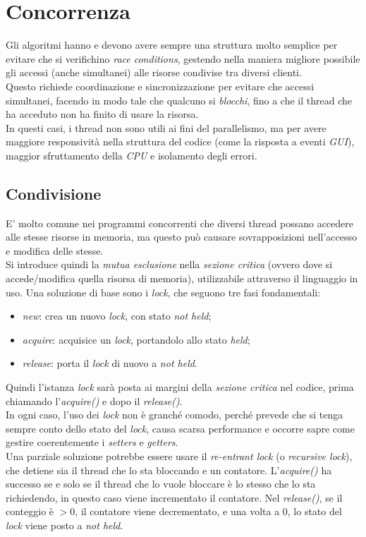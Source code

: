 \section{Concorrenza}
Gli algoritmi hanno e devono avere sempre una struttura molto semplice per evitare che si verifichino \textit{race conditions}, gestendo nella maniera migliore possibile gli accessi (anche simultanei) alle risorse condivise tra diversi clienti. \\
Questo richiede coordinazione e sincronizzazione per evitare che accessi simultanei, facendo in modo tale che qualcuno si \textit{blocchi}, fino a che il thread che ha acceduto non ha finito di usare la risorsa. \\
In questi casi, i thread non sono utili ai fini del parallelismo, ma per avere maggiore responsività nella struttura del codice (come la risposta a eventi \textit{GUI}), maggior sfruttamento della \textit{CPU} e isolamento degli errori. \\

\subsection{Condivisione}
E' molto comune nei programmi concorrenti che diversi thread possano accedere alle stesse risorse in memoria, ma questo può causare sovrapposizioni nell'accesso e modifica delle stesse. \\
Si introduce quindi la \textit{mutua esclusione} nella \textit{sezione critica} (ovvero dove si accede/modifica quella risorsa di memoria), utilizzabile attraverso il linguaggio in uso.
Una soluzione di base sono i \textit{lock}, che seguono tre fasi fondamentali:
\begin{itemize}
	\item \textit{new}: crea un nuovo \textit{lock}, con stato \textit{not held};
	\item \textit{acquire}: acquisice un \textit{lock}, portandolo allo stato \textit{held};
	\item \textit{release}: porta il \textit{lock} di nuovo a \textit{not held}.
\end{itemize}
Quindi l'istanza \textit{lock} sarà posta ai margini della \textit{sezione critica} nel codice, prima chiamando l'\textit{acquire()} e dopo il \textit{release()}. \\
In ogni caso, l'uso dei \textit{lock} non è granché comodo, perché prevede che si tenga sempre conto dello stato del \textit{lock}, causa scarsa performance e occorre sapre come gestire coerentemente i \textit{setters} e \textit{getters}. \\
Una parziale soluzione potrebbe essere usare il \textit{re-entrant lock} (o \textit{recursive lock}), che detiene sia il thread che lo sta bloccando e un contatore. L'\textit{acquire()} ha successo se e solo se il thread che lo vuole bloccare è lo stesso che lo sta richiedendo, in questo caso viene incrementato il contatore. Nel \textit{release()}, se il conteggio è $> 0$, il contatore viene decrementato, e una volta a $0$, lo stato del \textit{lock} viene posto a \textit{not held}.

